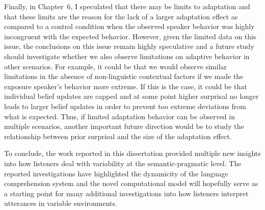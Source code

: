 Finally, in Chapter~6, I speculated that there may be limits to adaptation and that these limits are the reason for the lack of a larger adaptation effect as compared to a control condition when the observed speaker behavior was highly incongruent with the expected behavior. However, given the limited data on this issue, the conclusions on this issue remain highly speculative and a future study should investigate whether we also observe limitations on adaptive behavior in other scenarios. For example, it could be that we would observe similar limitations in the absence of non-linguistic contextual factors if we made the exposure speaker's behavior more extreme. If this is the case, it could be that individual belief updates are capped and at some point higher surprisal no longer leads to larger belief updates in order to prevent too extreme deviations from what is expected. Thus, if limited adaptation behavior can be observed in multiple scenarios, another important future direction would be to study the relationship between prior surprisal and the size of the adaptation effect.

\pagebreak

To conclude, the work reported in this dissertation provided multiple new insights into how listeners deal with variability at the semantic-pragmatic level. The reported investigations have highlighted the dynamicity of the language comprehension system and the novel computational model will hopefully serve as a starting point for many additional investigations into how listeners interpret utterances in variable environments.


